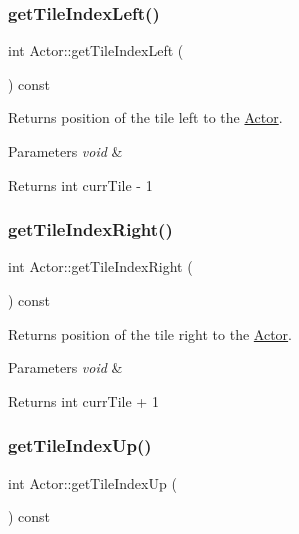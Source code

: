 \subsubsection{\texorpdfstring{get\+Tile\+Index\+Left()}{getTileIndexLeft()}}
{\footnotesize\ttfamily int Actor\+::get\+Tile\+Index\+Left (\begin{DoxyParamCaption}{ }\end{DoxyParamCaption}) const}



Returns position of the tile left to the \mbox{\hyperlink{class_actor}{Actor}}. 


\begin{DoxyParams}{Parameters}
{\em void} & \\
\hline
\end{DoxyParams}
\begin{DoxyReturn}{Returns}
int curr\+Tile -\/ 1 
\end{DoxyReturn}
\mbox{\label{class_actor_ac54394e212a1a1f51ae82202a8144421}} 
\subsubsection{\texorpdfstring{get\+Tile\+Index\+Right()}{getTileIndexRight()}}
{\footnotesize\ttfamily int Actor\+::get\+Tile\+Index\+Right (\begin{DoxyParamCaption}{ }\end{DoxyParamCaption}) const}



Returns position of the tile right to the \mbox{\hyperlink{class_actor}{Actor}}. 


\begin{DoxyParams}{Parameters}
{\em void} & \\
\hline
\end{DoxyParams}
\begin{DoxyReturn}{Returns}
int curr\+Tile + 1 
\end{DoxyReturn}
\mbox{\label{class_actor_a92a718240f1b2b51e2f0dee763435f58}} 
\subsubsection{\texorpdfstring{get\+Tile\+Index\+Up()}{getTileIndexUp()}}
{\footnotesize\ttfamily int Actor\+::get\+Tile\+Index\+Up (\begin{DoxyParamCaption}{ }\end{DoxyParamCaption}) const}



